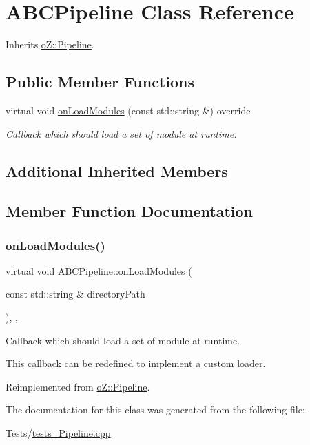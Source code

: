 \hypertarget{class_a_b_c_pipeline}{}\section{A\+B\+C\+Pipeline Class Reference}
\label{class_a_b_c_pipeline}


Inherits \mbox{\hyperlink{classo_z_1_1_pipeline}{o\+Z\+::\+Pipeline}}.

\subsection*{Public Member Functions}
\begin{DoxyCompactItemize}
\item 
virtual void \mbox{\hyperlink{class_a_b_c_pipeline_a1a476cf5b64733b13b709ad0d8fbd3a7}{on\+Load\+Modules}} (const std\+::string \&) override
\begin{DoxyCompactList}\small\item\em Callback which should load a set of module at runtime. \end{DoxyCompactList}\end{DoxyCompactItemize}
\subsection*{Additional Inherited Members}


\subsection{Member Function Documentation}
\mbox{\label{class_a_b_c_pipeline_a1a476cf5b64733b13b709ad0d8fbd3a7}} 
\subsubsection{\texorpdfstring{onLoadModules()}{onLoadModules()}}
{\footnotesize\ttfamily virtual void A\+B\+C\+Pipeline\+::on\+Load\+Modules (\begin{DoxyParamCaption}\item[{const std\+::string \&}]{directory\+Path }\end{DoxyParamCaption})\hspace{0.3cm}{\ttfamily [inline]}, {\ttfamily [override]}, {\ttfamily [virtual]}}



Callback which should load a set of module at runtime. 

This callback can be redefined to implement a custom loader. 

Reimplemented from \mbox{\hyperlink{classo_z_1_1_pipeline_a0265d90a5540e69b25069d5d96973c53}{o\+Z\+::\+Pipeline}}.



The documentation for this class was generated from the following file\+:\begin{DoxyCompactItemize}
\item 
Tests/\mbox{\hyperlink{tests___pipeline_8cpp}{tests\+\_\+\+Pipeline.\+cpp}}\end{DoxyCompactItemize}
